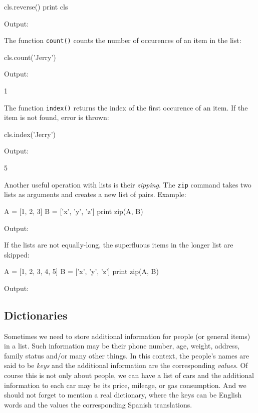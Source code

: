 \begin{bluecode}
cls.reverse()
print cls
\end{bluecode}
Output:

\begin{bluecode}
\end{bluecode}
The function {\tt count()} counts the number of occurences of an item
in the list:

\begin{bluecode}
cls.count('Jerry')
\end{bluecode}
Output:

\begin{bluecode}
1
\end{bluecode}
The function {\tt index()} returns the index of the first occurence 
of an item. If the item is not found, error is thrown:

\begin{bluecode}
cls.index('Jerry')
\end{bluecode}
Output:

\begin{bluecode}
5
\end{bluecode}
Another useful operation with lists is their {\em zipping}. The {\tt zip} command takes two lists as arguments 
and creates a new list of pairs. Example:

\begin{bluecode}
A = [1, 2, 3]
B = ['x', 'y', 'z']
print zip(A, B)
\end{bluecode}
Output:

\begin{bluecode}
[(1, 'x'), (2, 'y'), (3, 'z')]
\end{bluecode}
If the lists are not equally-long, the superfluous items in the longer list 
are skipped:

\begin{bluecode}
A = [1, 2, 3, 4, 5]
B = ['x', 'y', 'z']
print zip(A, B)
\end{bluecode}
Output:

\begin{bluecode}
[(1, 'x'), (2, 'y'), (3, 'z')]
\end{bluecode}

\subsection{Dictionaries}

Sometimes we need to store additional information for 
people (or general items) in a list. Such information may be  
their phone number, age, weight, address, family 
status and/or many other things. In this context, the 
people's names are said to be {\em keys} and the additional 
information are the corresponding {\em values}. Of course this 
is not only about people, we can have a list of cars and the 
additional information to each car may be its price, mileage, or
gas consumption. And we should not forget to mention a real 
dictionary, where the keys can be English words and the values the 
corresponding Spanish translations.

